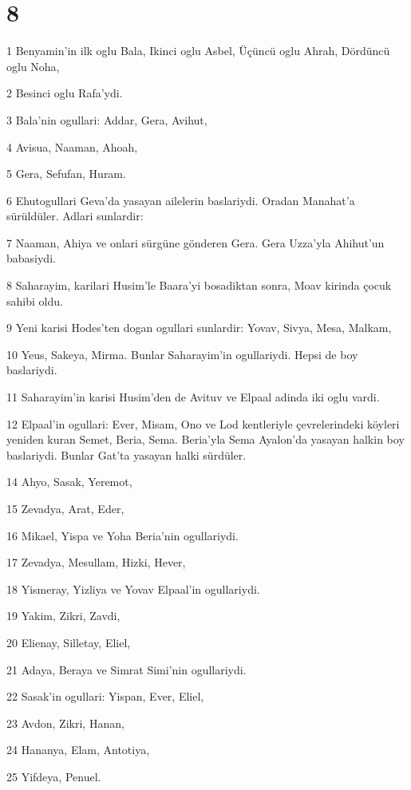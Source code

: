 \chapter{8}

\par 1 Benyamin'in ilk oglu Bala, Ikinci oglu Asbel, Üçüncü oglu Ahrah, Dördüncü oglu Noha,
\par 2 Besinci oglu Rafa'ydi.
\par 3 Bala'nin ogullari: Addar, Gera, Avihut,
\par 4 Avisua, Naaman, Ahoah,
\par 5 Gera, Sefufan, Huram.
\par 6 Ehutogullari Geva'da yasayan ailelerin baslariydi. Oradan Manahat'a sürüldüler. Adlari sunlardir:
\par 7 Naaman, Ahiya ve onlari sürgüne gönderen Gera. Gera Uzza'yla Ahihut'un babasiydi.
\par 8 Saharayim, karilari Husim'le Baara'yi bosadiktan sonra, Moav kirinda çocuk sahibi oldu.
\par 9 Yeni karisi Hodes'ten dogan ogullari sunlardir: Yovav, Sivya, Mesa, Malkam,
\par 10 Yeus, Sakeya, Mirma. Bunlar Saharayim'in ogullariydi. Hepsi de boy baslariydi.
\par 11 Saharayim'in karisi Husim'den de Avituv ve Elpaal adinda iki oglu vardi.
\par 12 Elpaal'in ogullari: Ever, Misam, Ono ve Lod kentleriyle çevrelerindeki köyleri yeniden kuran Semet, Beria, Sema. Beria'yla Sema Ayalon'da yasayan halkin boy baslariydi. Bunlar Gat'ta yasayan halki sürdüler.
\par 14 Ahyo, Sasak, Yeremot,
\par 15 Zevadya, Arat, Eder,
\par 16 Mikael, Yispa ve Yoha Beria'nin ogullariydi.
\par 17 Zevadya, Mesullam, Hizki, Hever,
\par 18 Yismeray, Yizliya ve Yovav Elpaal'in ogullariydi.
\par 19 Yakim, Zikri, Zavdi,
\par 20 Elienay, Silletay, Eliel,
\par 21 Adaya, Beraya ve Simrat Simi'nin ogullariydi.
\par 22 Sasak'in ogullari: Yispan, Ever, Eliel,
\par 23 Avdon, Zikri, Hanan,
\par 24 Hananya, Elam, Antotiya,
\par 25 Yifdeya, Penuel.
